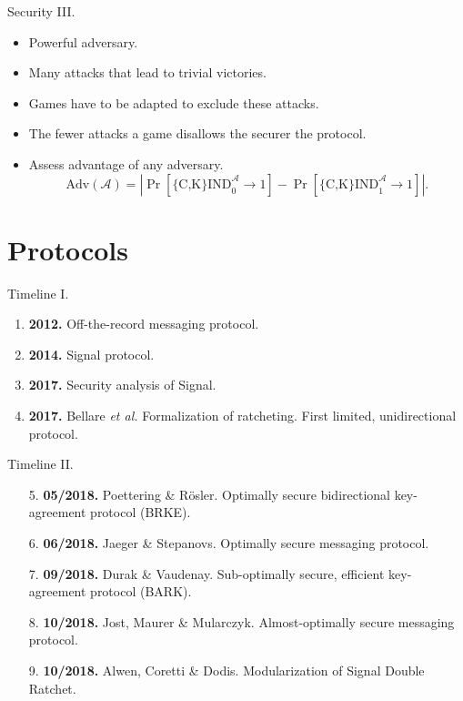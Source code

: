 \documentclass{beamer}
\renewcommand{\t}{\text}
\begin{document}
\begin{frame}{Security III.}
  \begin{itemize}
  \item Powerful adversary.
  \item Many attacks that lead to trivial victories.
  \item Games have to be adapted to exclude these attacks.
  \item The fewer attacks a game disallows the securer the protocol.
  \item Assess advantage of any adversary.
\[
  \t{Adv}(\mathcal{A}) = \left| \Pr \left[ \t{\{C,K\}IND}_0^\mathcal{A} \rightarrow 1 \right] -
                                \Pr \left[ \t{\{C,K\}IND}_1^\mathcal{A} \rightarrow 1 \right]
                         \right|.
\]
  \end{itemize}
\end{frame}

\section{Protocols}
\label{sec:protocols}

\begin{frame}{Timeline I.}
  \begin{enumerate}
  \item \textbf{2012.} Off-the-record messaging protocol.
  \item \textbf{2014.} Signal protocol.
  \item \textbf{2017.} Security analysis of Signal.
  \item \textbf{2017.} Bellare {\em et al.} Formalization of ratcheting. First
    limited, unidirectional protocol.
  \end{enumerate}
\end{frame}

\begin{frame}{Timeline II.}
  \begin{enumerate}
  \item[5.] \textbf{05/2018.} Poettering \& Rösler. Optimally secure bidirectional
    key-agreement protocol (BRKE).
  \item[6.] \textbf{06/2018.} Jaeger \& Stepanovs. Optimally secure messaging protocol.
  \item[7.] \textbf{09/2018.} Durak \& Vaudenay. Sub-optimally secure, efficient key-agreement
    protocol (BARK).
  \item[8.] \textbf{10/2018.} Jost, Maurer \& Mularczyk. Almost-optimally secure messaging
    protocol.
  \item[9.] \textbf{10/2018.} Alwen, Coretti \& Dodis. Modularization of Signal Double
    Ratchet.
  \end{enumerate}
\end{frame}
\end{document}
